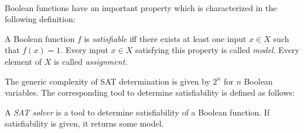 \begin{table}[pt]
  \centering
  ~
  ~
  \caption{Truth tables for ,  and }
  \label{tab:andornot-truthtables}
\end{table}

Boolean functions have an important property which is characterized
in the following definition:

\begin{defi}
  A Boolean function $f$ is \emph{satisfiable} iff there exists at least one
  input $x \in X$ such that $f(x) = 1$.
  Every input $x \in X$ satisfying this property is called \emph{model}.
  Every element of $X$ is called \emph{assignment}.
\end{defi}

The generic complexity of SAT determination is given by $2^n$ for $n$ Boolean variables.
The corresponding tool to determine satisfiability is defined as follows:

\begin{defi}
  A \emph{SAT solver} is a tool to determine satisfiability of a Boolean function.
  If satisfiability is given, it returns some model.
\end{defi}

